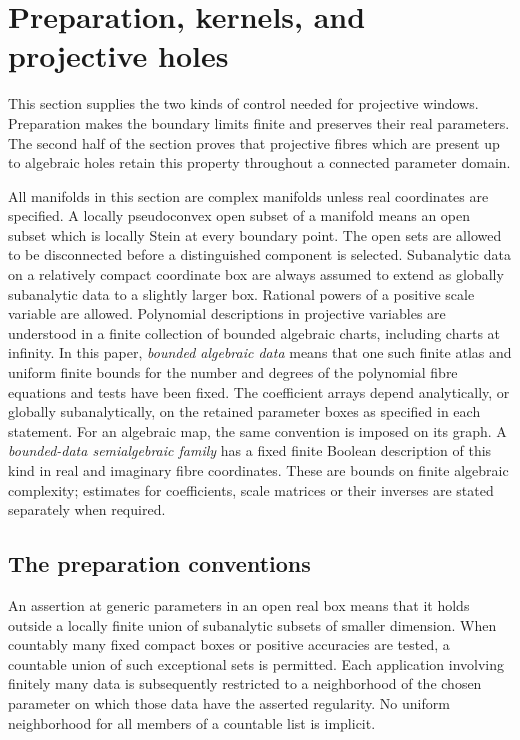 \section{Preparation, kernels, and projective holes}
\label{sec:prep-section}

This section supplies the two kinds of control needed for projective windows. Preparation makes the boundary limits finite and preserves their real parameters. The second half of the section proves that projective fibres which are present up to algebraic holes retain this property throughout a connected parameter domain.

All manifolds in this section are complex manifolds unless real coordinates are specified. A locally pseudoconvex open subset of a manifold means an open subset which is locally Stein at every boundary point. The open sets are allowed to be disconnected before a distinguished component is selected. Subanalytic data on a relatively compact coordinate box are always assumed to extend as globally subanalytic data to a slightly larger box. Rational powers of a positive scale variable are allowed. Polynomial descriptions in projective variables are understood in a finite collection of bounded algebraic charts, including charts at infinity. In this paper, \emph{bounded algebraic data} means that one such finite atlas and uniform finite bounds for the number and degrees of the polynomial fibre equations and tests have been fixed. The coefficient arrays depend analytically, or globally subanalytically, on the retained parameter boxes as specified in each statement. For an algebraic map, the same convention is imposed on its graph. A \emph{bounded-data semialgebraic family} has a fixed finite Boolean description of this kind in real and imaginary fibre coordinates. These are bounds on finite algebraic complexity; estimates for coefficients, scale matrices or their inverses are stated separately when required.

\subsection{The preparation conventions}

\begin{definition}\label{def:prep-generic}
An assertion at generic parameters in an open real box means that it holds outside a locally finite union of subanalytic subsets of smaller dimension. When countably many fixed compact boxes or positive accuracies are tested, a countable union of such exceptional sets is permitted. Each application involving finitely many data is subsequently restricted to a neighborhood of the chosen parameter on which those data have the asserted regularity. No uniform neighborhood for all members of a countable list is implicit.
\end{definition}

